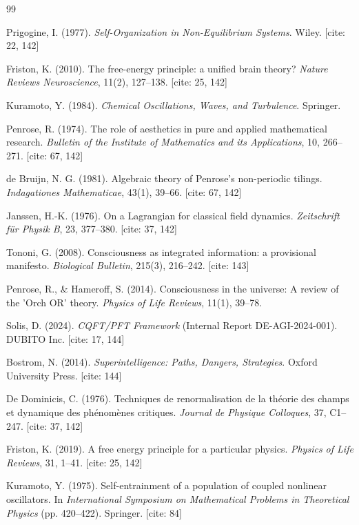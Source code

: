 \documentclass[12pt,a4paper]{article}
\theoremstyle{plain}
\theoremstyle{definition}
\begin{document}
\begin{thebibliography}{99}

Prigogine, I. (1977). \textit{Self-Organization in Non-Equilibrium Systems}. Wiley. [cite: 22, 142]

Friston, K. (2010). The free-energy principle: a unified brain theory? \textit{Nature Reviews Neuroscience}, 11(2), 127--138. [cite: 25, 142]

Kuramoto, Y. (1984). \textit{Chemical Oscillations, Waves, and Turbulence}. Springer. 

Penrose, R. (1974). The role of aesthetics in pure and applied mathematical research. \textit{Bulletin of the Institute of Mathematics and its Applications}, 10, 266--271. [cite: 67, 142]

de Bruijn, N. G. (1981). Algebraic theory of Penrose's non-periodic tilings. \textit{Indagationes Mathematicae}, 43(1), 39--66. [cite: 67, 142]

Janssen, H.-K. (1976). On a Lagrangian for classical field dynamics. \textit{Zeitschrift für Physik B}, 23, 377--380. [cite: 37, 142]

Tononi, G. (2008). Consciousness as integrated information: a provisional manifesto. \textit{Biological Bulletin}, 215(3), 216--242. [cite: 143]

Penrose, R., \& Hameroff, S. (2014). Consciousness in the universe: A review of the 'Orch OR' theory. \textit{Physics of Life Reviews}, 11(1), 39--78. 

Solis, D. (2024). \textit{CQFT/PFT Framework} (Internal Report DE-AGI-2024-001). DUBITO Inc. [cite: 17, 144]

Bostrom, N. (2014). \textit{Superintelligence: Paths, Dangers, Strategies}. Oxford University Press. [cite: 144]

De Dominicis, C. (1976). Techniques de renormalisation de la théorie des champs et dynamique des phénomènes critiques. \textit{Journal de Physique Colloques}, 37, C1--247. [cite: 37, 142]

Friston, K. (2019). A free energy principle for a particular physics. \textit{Physics of Life Reviews}, 31, 1--41. [cite: 25, 142]

Kuramoto, Y. (1975). Self-entrainment of a population of coupled nonlinear oscillators. In \textit{International Symposium on Mathematical Problems in Theoretical Physics} (pp. 420--422). Springer. [cite: 84]


\end{thebibliography}
\end{document}

